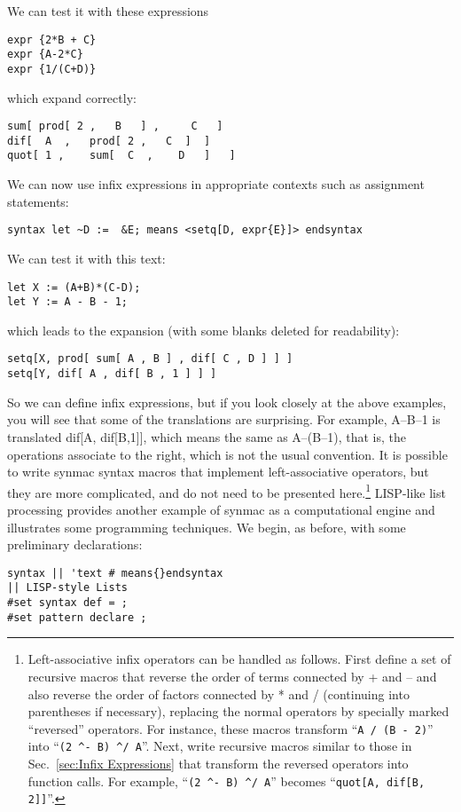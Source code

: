 \documentclass[12pt]{article}
\begin{document}
We can test it with these expressions
\begin{lstlisting}[frame=single]
expr {2*B + C}
expr {A-2*C}
expr {1/(C+D)}
\end{lstlisting}
which expand correctly:
\begin{lstlisting}[frame=single]
sum[ prod[ 2 ,   B   ] ,     C   ] 
dif[  A  ,   prod[ 2 ,   C  ]  ] 
quot[ 1 ,    sum[  C  ,    D   ]   ]  
\end{lstlisting}
We can now use infix expressions in appropriate contexts such as assignment statements:
\begin{lstlisting}[frame=single]
syntax let ~D :=  &E; means <setq[D, expr{E}]> endsyntax
\end{lstlisting}
We can test it with this text:
\begin{lstlisting}[frame=single]
let X := (A+B)*(C-D);
let Y := A - B - 1;
\end{lstlisting}
which leads to the expansion (with some blanks deleted for readability):
\begin{lstlisting}[frame=single]
setq[X, prod[ sum[ A , B ] , dif[ C , D ] ] ] 
setq[Y, dif[ A , dif[ B , 1 ] ] ] 
\end{lstlisting}
So we can define infix expressions, but if you look closely at the above examples, you will see that some of the translations are surprising.
For example, A--B--1 is translated dif[A, dif[B,1]], which means the same as A--(B--1), that is, the operations associate to the right, which is not the usual convention.
It is possible to write synmac syntax macros that implement left-associative operators, but they are more complicated, and do not need to be presented here.\footnote{
Left-associative infix operators can be handled as follows.
First define a set of recursive macros that reverse the order of terms connected by + and -- and also reverse the order of factors connected by * and / (continuing into parentheses if necessary), replacing the normal operators by specially marked ``reversed'' operators.
For instance, these macros transform ``\lstinline"A / (B - 2)"'' into ``\lstinline"(2 ^- B) ^/ A"''.
Next, write recursive macros similar to those in Sec.\ \ref{sec:Infix Expressions} that transform the reversed operators into function calls.
For example, ``\lstinline"(2 ^- B) ^/ A"'' becomes ``\lstinline"quot[A, dif[B, 2]]"''.
}
LISP-like list processing provides another example of synmac as a computational engine and illustrates some programming techniques.
We begin, as before, with some preliminary declarations:
\begin{lstlisting}[frame=single]
syntax || 'text # means{}endsyntax
|| LISP-style Lists
#set syntax def = ;
#set pattern declare ;
\end{lstlisting}
\end{document}
